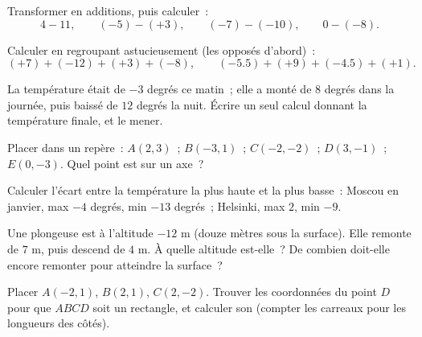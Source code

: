 \begin{exercise}[$\star$]\label{exo:g7:negatives:5}
Transformer en additions, puis calculer~:
\[
4 - 11, \qquad
(-5) - (+3), \qquad
(-7) - (-10), \qquad
0 - (-8).
\]
\end{exercise}

\begin{exercise}[$\star$]\label{exo:g7:negatives:6}
Calculer en regroupant astucieusement (les opposés d'abord)~:
\[
(+7) + (-12) + (+3) + (-8), \qquad
(-5.5) + (+9) + (-4.5) + (+1).
\]
\end{exercise}

\begin{exercise}[$\star$]\label{exo:g7:negatives:7}
La température était de $-3$ degrés ce matin~; elle a monté de $8$
degrés dans la journée, puis baissé de $12$ degrés la nuit. Écrire un
seul calcul donnant la température finale, et le mener.
\end{exercise}

\begin{exercise}[$\star$]\label{exo:g7:negatives:8}
Placer dans un repère~: $A(2, 3)$~; $B(-3, 1)$~; $C(-2, -2)$~;
$D(3, -1)$~; $E(0, -3)$. Quel point est sur un axe~?
\end{exercise}

\begin{exercise}[$\star\star$]\label{exo:g7:negatives:9}
Calculer l'écart entre la température la plus haute et la plus
basse~: Moscou en janvier, max $-4$ degrés, min $-13$ degrés~;
Helsinki, max $2$, min $-9$.
\end{exercise}

\begin{exercise}[$\star\star$]\label{exo:g7:negatives:10}
Une plongeuse est à l'altitude $-12$ m (douze mètres sous la
surface). Elle remonte de $7$ m, puis descend de $4$ m. À quelle
altitude est-elle~? De combien doit-elle encore remonter pour
atteindre la surface~?
\end{exercise}

\begin{exercise}[$\star\star$]\label{exo:g7:negatives:11}
Placer $A(-2, 1)$, $B(2, 1)$, $C(2, -2)$. Trouver les coordonnées du
point $D$ pour que $ABCD$ soit un rectangle, et calculer son
 (compter les carreaux pour les longueurs des côtés).
\end{exercise}

